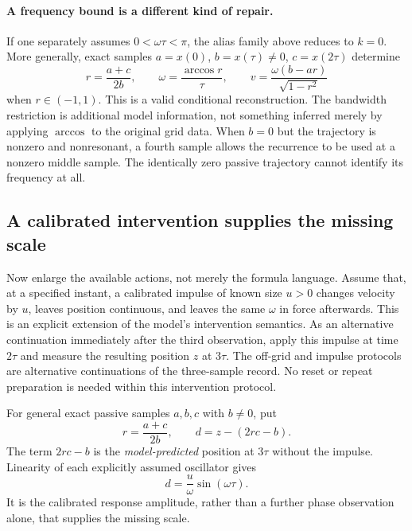 \documentclass[11pt]{article}
\theoremstyle{definition}
\begin{document}
\paragraph{A frequency bound is a different kind of repair.}
If one separately assumes $0<\omega\tau<\pi$, the alias family above reduces
to $k=0$. More generally, exact samples $a=x(0)$, $b=x(\tau)\ne0$,
$c=x(2\tau)$ determine
\begin{equation}\label{eq:sci-band-reconstruction}
 r=\frac{a+c}{2b},\qquad
 \omega=\frac{\arccos r}{\tau},\qquad
 v=\frac{\omega(b-ar)}{\sqrt{1-r^2}}
\end{equation}
when $r\in(-1,1)$. This is a valid conditional reconstruction. The bandwidth
restriction is additional model information, not something inferred merely
by applying $\arccos$ to the original grid data. When $b=0$ but the trajectory
is nonzero and nonresonant, a fourth sample allows the recurrence to be used
at a nonzero middle sample. The identically zero passive trajectory cannot
identify its frequency at all.

\subsection{A calibrated intervention supplies the missing scale}

Now enlarge the available actions, not merely the formula language. Assume
that, at a specified instant, a calibrated impulse of known size $u>0$
changes velocity by $u$, leaves position continuous, and leaves the same
$\omega$ in force afterwards. This is an explicit extension of the model's
intervention semantics. As an alternative continuation immediately after the third observation,
apply this impulse at time $2\tau$ and measure the resulting position $z$ at
$3\tau$. The off-grid and impulse protocols are alternative continuations of the
three-sample record.
No reset or repeat preparation is needed within this intervention protocol.

For general exact passive samples $a,b,c$ with $b\ne0$, put
\begin{equation}\label{eq:sci-response}
 r=\frac{a+c}{2b},\qquad
 d=z-(2rc-b).
\end{equation}
The term $2rc-b$ is the \emph{model-predicted} position at $3\tau$ without
the impulse. Linearity of each explicitly assumed oscillator gives
\[
 d=\frac{u}{\omega}\sin(\omega\tau).
\]
It is the calibrated response amplitude, rather than a further phase
observation alone, that supplies the missing scale.
\end{document}
